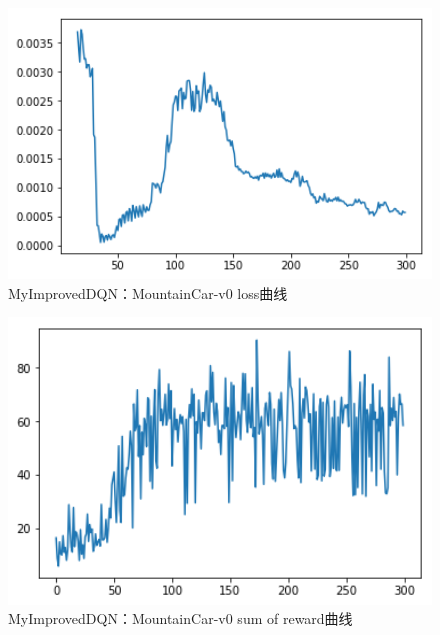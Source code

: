 \documentclass[a4paper,UTF8]{article}
\theoremstyle{definition}
\begin{document}
    \begin{center}
    \begin{figure}[H]
          \centering
          \includegraphics[width=12cm]{16.png}
          \caption{MyImprovedDQN：MountainCar-v0 loss曲线}
          \label{fig:2.3}
    \end{figure}
    \end{center}
    \begin{center}
    \begin{figure}[H]
          \centering
          \includegraphics[width=12cm]{17.png}
          \caption{MyImprovedDQN：MountainCar-v0 sum of reward曲线}
          \label{fig:2.3}
    \end{figure}
    \end{center}
\end{document}
